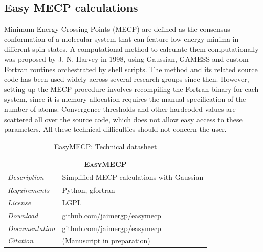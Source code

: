 \subsection{Easy MECP calculations}


Minimum Energy Crossing Points (MECP) are defined as the consensus conformation of a molecular system that can feature low-energy minima in different spin states. A computational method to calculate them computationally was proposed by J. N. Harvey in 1998,\cite{harvey1998} using Gaussian, GAMESS and custom Fortran routines orchestrated by shell scripts. The method and its related source code has been used widely across several research groups since then. However, setting up the MECP procedure involves recompiling the Fortran binary for each system, since it is memory allocation requires the manual specification of the number of atoms. Convergence thresholds and other hardcoded values are scattered all over the source code, which does not allow easy access to these parameters. All these technical difficulties should not concern the user.


\begin{table}[hbtp]
	\caption{EasyMECP: Technical datasheet}
	\footnotesize
	\newcommand{\tableheading}[1]{\multicolumn{2}{c}{\textsc{#1}}}
	\begin{tabularx}{\textwidth}{RL}
		\toprule
		\tableheading{EasyMECP}\\
		\toprule
		\textit{Description} & Simplified MECP calculations with Gaussian \\
		\midrule
		\textit{Requirements} & Python, gfortran \\
		\midrule
		\textit{License} & LGPL \\
		\midrule
		\textit{Download} & \href{https://github.com/jaimergp/easymecp}{github.com/jaimergp/easymecp} \\
		\midrule
		\textit{Documentation} & \href{https://github.com/jaimergp/easymecp}{github.com/jaimergp/easymecp} \\
		\midrule
		\textit{Citation} & (Manuscript in preparation) \\
		\bottomrule

	\end{tabularx}
\end{table}

